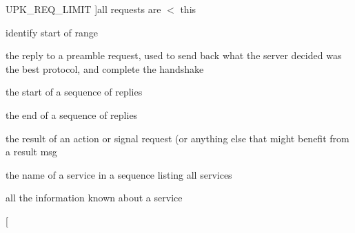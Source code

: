 \begin{Desc}
\begin{description}
{UPK\_\-REQ\_\-LIMIT\label{tp_8c_gab04f5fc5314f6296f0ef4b171d1b4282a48b2d4b569c9fc0f9032fa34a6c6dd30}
}]all requests are $<$ this \item[{\em 
UPK\_\-REPL\_\-ORIGIN\label{tp_8c_gab04f5fc5314f6296f0ef4b171d1b4282add29cfc837c5ebedb09f56117e74c163}
}]identify start of range \item[{\em 
UPK\_\-REPL\_\-PREAMBLE\label{tp_8c_gab04f5fc5314f6296f0ef4b171d1b4282a96215c5d056e77a04493e423dc22c6b4}
}]the reply to a preamble request, used to send back what the server decided was the best protocol, and complete the handshake \item[{\em 
UPK\_\-REPL\_\-SEQ\_\-START\label{tp_8c_gab04f5fc5314f6296f0ef4b171d1b4282af5f2208106bd9e4b85b58abf0c91016d}
}]the start of a sequence of replies \item[{\em 
UPK\_\-REPL\_\-SEQ\_\-END\label{tp_8c_gab04f5fc5314f6296f0ef4b171d1b4282a08f5de1191d69da4a59758eeef26bac2}
}]the end of a sequence of replies \item[{\em 
UPK\_\-REPL\_\-RESULT\label{tp_8c_gab04f5fc5314f6296f0ef4b171d1b4282a553cb105e6ff4b627e2799cfc3f8f74c}
}]the result of an action or signal request (or anything else that might benefit from a result msg \item[{\em 
UPK\_\-REPL\_\-LISTING\label{tp_8c_gab04f5fc5314f6296f0ef4b171d1b4282ac158a8306626930b47ef905a7830e07f}
}]the name of a service in a sequence listing all services \item[{\em 
UPK\_\-REPL\_\-SVCINFO\label{tp_8c_gab04f5fc5314f6296f0ef4b171d1b4282ae1add19bc555a5ce4badb159f98e0e37}
}]all the information known about a service \item[{\em 
}
\end{description}
\end{Desc}

